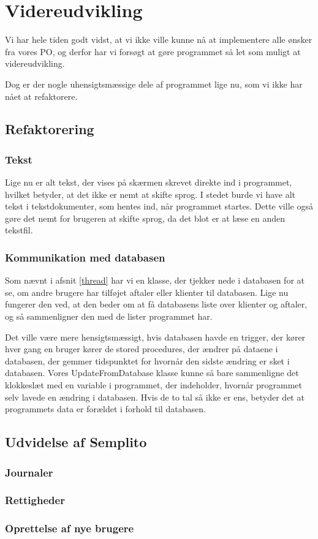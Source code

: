 \section{Videreudvikling}
\label{kapitel:Videreudvikling}

Vi har hele tiden godt vidst, at vi ikke ville kunne nå at implementere alle ønsker fra vores PO, og derfor har vi forsøgt at gøre programmet så let som muligt at videreudvikling.

Dog er der nogle uhensigtsmæssige dele af programmet lige nu, som vi ikke har nået at refaktorere.

\subsection{Refaktorering}
\subsubsection{Tekst}
Lige nu er alt tekst, der vises på skærmen skrevet direkte ind i programmet, hvilket betyder, at det ikke er nemt at skifte sprog.
I stedet burde vi have alt tekst i tekstdokumenter, som hentes ind, når programmet startes.
Dette ville også gøre det nemt for brugeren at skifte sprog, da det blot er at læse en anden tekstfil.

\subsubsection{Kommunikation med databasen}
Som nævnt i afsnit \ref{thread} har vi en klasse, der tjekker nede i databasen for at se, om andre brugere har tilføjet aftaler eller klienter til databasen.
Lige nu fungerer den ved, at den beder om at få databasens liste over klienter og aftaler, og så sammenligner den med de lister programmet har.

Det ville være mere hensigtsmæssigt, hvis databasen havde en trigger, der kører hver gang en bruger kører de stored procedures, der ændrer på dataene i databasen, der gemmer tidspunktet for hvornår den sidste ændring er sket i databasen.
Vores UpdateFromDatabase klasse kunne så bare sammenligne det klokkeslæt med en variable i programmet, der indeholder, hvornår programmet selv lavede en ændring i databasen.
Hvis de to tal så ikke er ens, betyder det at programmets data er forældet i forhold til databasen.

\subsection{Udvidelse af Semplito}

\subsubsection{Journaler}

\subsubsection{Rettigheder}

\subsubsection{Oprettelse af nye brugere}